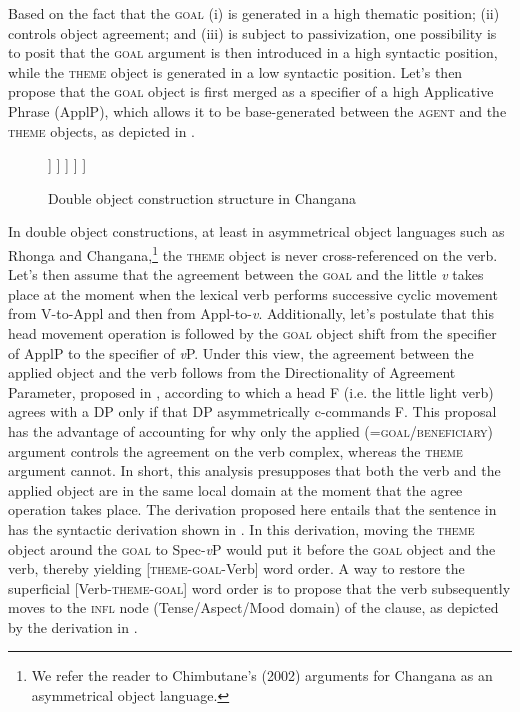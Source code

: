 \documentclass[output=paper]{langsci/langscibook}
\begin{document}
Based on the fact that the \textsc{goal} (i) is generated in a high thematic position; (ii) controls object agreement; and (iii) is subject to passivization, one possibility is to posit that the \textsc{goal} argument is then introduced in a high syntactic position, while the \textsc{theme} object is generated in a low syntactic position. Let’s then propose that the \textsc{goal} object is first merged as a specifier of a high Applicative Phrase (ApplP), which allows it to be base-generated between the \textsc{agent} and the \textsc{theme} objects, as depicted in .

  
 

\begin{figure}
\caption{Double object construction structure in Changana}
\begin{forest}
[vP
  [Agent] [v'
    [v°] [ApplP
	[Goal] [Appl'
	    [Appl°] [VP
	      [V°] [theme]
	    ]
	  ]    
        ]
    ]
]
\end{forest}

\label{fig:nguna:3}
\end{figure}

In double object constructions, at least in {asymmetrical object languages such as Rhonga and Changana,}\footnote{ {We refer the reader to Chimbutane’s (2002) arguments for Changana as an asymmetrical object language.}} {}the \textsc{theme} object is never cross-referenced on the verb. Let’s then assume that the agreement between the \textsc{goal} and the little {\textit{v}} takes place at the moment when the lexical verb performs successive cyclic movement from V-to-Appl and then from Appl-to-{\textit{v}}. Additionally, let’s postulate that this head movement operation is followed by the \textsc{goal} object shift from the specifier of ApplP to the specifier of {\textit{v}}P. Under this view, the agreement between the applied object and the verb follows from the Directionality of Agreement Parameter, proposed in , according to which a head F (i.e. the little light verb) agrees with a DP only if that DP asymmetrically c-commands F. This proposal has the advantage of accounting for why only the applied (=\textsc{goal/beneficiary}) argument controls the agreement on the verb complex, whereas the \textsc{theme} argument cannot. In short, this analysis presupposes that both the verb and the applied object are in the same local domain at the moment that the agree operation takes place. The derivation proposed here entails that the sentence in  has the syntactic derivation shown in . In this derivation, moving the \textsc{theme} object around the \textsc{goal} to Spec-{\textit{v}}P would put it before the \textsc{goal} object and the verb, thereby yielding [\textsc{theme-goal}-Verb] word order. A way to restore the superficial [Verb-\textsc{theme-goal}] word order is to propose that the verb subsequently moves to the {\textsc{infl}} node (Tense/Aspect/Mood domain) of the clause, as depicted by the derivation in .
\end{document}
